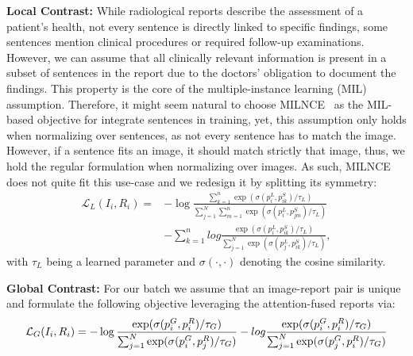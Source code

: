 \documentclass[runningheads]{llncs}
\begin{document}
\noindent\textbf{Local Contrast:} While radiological reports describe the assessment of a patient's health, not every sentence is directly linked to specific findings, some sentences mention clinical procedures or required follow-up examinations.
However, we can assume that all clinically relevant information is present in a subset of sentences in the report due to the doctors' obligation to document the findings.
This property is the core of the multiple-instance learning (MIL) assumption. 
Therefore, it might seem natural to choose MILNCE~\cite{miech2020end} as the MIL-based objective for integrate sentences in training, yet, this assumption only holds when normalizing over sentences, as not every sentence has to match the image. However, if a sentence fits an image, it should match strictly that image, thus, we hold the regular formulation when normalizing over images.
As such, MILNCE does not quite fit this use-case and we redesign it by splitting its symmetry:
\begin{equation}
    \begin{aligned}
        \mathcal{L}_{L}(I_i, R_i) =  & - \log \frac{
    \sum^{n}_{k=1} \exp(\sigma(p^L_i, p_{ik}^{S})/\tau_L) }
    {\sum^N_{j=1} \sum^{n}_{m=1}  \exp(\sigma(p_i^{L}, p_{jm}^{S}) /\tau_L)  } \\&- \sum^{n}_{k=1} log \frac{
    \exp(\sigma(p_i^{L}, p_{ik}^{S})/\tau_L) }
    {\sum^N_{j=1} \exp(\sigma(p_j^{L}, p_{ik}^{S}) /\tau_L)  },
    \end{aligned}
\end{equation}
with $\tau_L$ being a learned parameter and $\sigma(\cdot,\cdot)$ denoting the cosine similarity.

\noindent\textbf{Global Contrast:} For our batch we assume that an image-report pair is unique and formulate the following objective leveraging the attention-fused  reports via: 
\begin{equation}
    \mathcal{L}_{G}(I_i, R_i) =  - \log \frac{
    \exp(\sigma(p_i^{G}, p_{i}^{R})/\tau_G) }
    {\sum^N_{j=1} \exp(\sigma(p_i^{G}, p_{j}^{R}) /\tau_G)  } \\- log \frac{
    \exp(\sigma(p_i^{G}, p_{i}^{R})/\tau_G) }
    {\sum^N_{j=1} \exp(\sigma(p_j^{G}, p_{i}^{R}) /\tau_G)  }
\end{equation}
\end{document}
